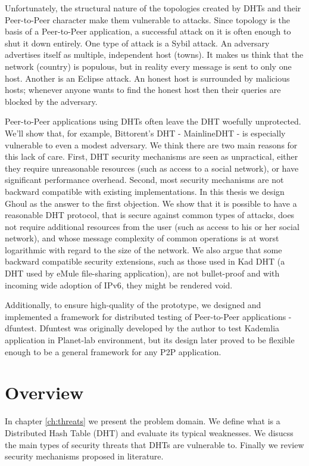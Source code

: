 Unfortunately, the structural nature of the topologies created by DHTs and
their Peer-to-Peer character make them vulnerable to attacks.
Since topology is the basis of a Peer-to-Peer application, a successful attack
on it is often enough to shut it down entirely.
One type of attack is a Sybil attack.
An adversary advertises itself as multiple, independent host (towns).
It makes us think that the network (country) is populous, but in reality every
message is sent to only one host.
Another is an Eclipse attack.
An honest host is surrounded by malicious hosts; whenever anyone wants to find
the honest host then their queries are blocked by the adversary.

Peer-to-Peer applications using DHTs often leave the DHT woefully unprotected.
We'll show that, for example, Bittorent's DHT - MainlineDHT - is especially
vulnerable to even a modest adversary.
We think there are two main reasons for this lack of care.
First, DHT security mechanisms are seen as unpractical, either they require
unreasonable resources (such as access to a social network), or have significant
performance overhead.
Second, most security mechanisms are not backward compatible with existing
implementations.
In this thesis we design Ghoul as the answer to the first objection.
We show that it is possible to have a reasonable DHT protocol, that is secure
against common types of attacks, does not require additional resources from the
user (such as access to his or her social network), and whose message complexity
of common operations is at worst logarithmic with regard to the size of the
network.
We also argue that some backward compatible security extensions, such as those
used in Kad DHT (a DHT used by eMule file-sharing application), are not
bullet-proof and with incoming wide adoption of IPv6, they might be rendered
void.

Additionally, to ensure high-quality of the prototype, we designed and
implemented a framework for distributed testing of Peer-to-Peer applications -
dfuntest.
Dfuntest was originally developed by the author to test Kademlia application in
Planet-lab environment, but its design later proved to be flexible enough to be
a general framework for any P2P application.

\section{Overview}
In chapter \ref{ch:threats} we present the problem domain.
We define what is a Distributed Hash Table (DHT) and evaluate its typical
weaknesses.
We disucss the main types of security threats that DHTs are vulnerable to.
Finally we review security mechanisms proposed in literature.

